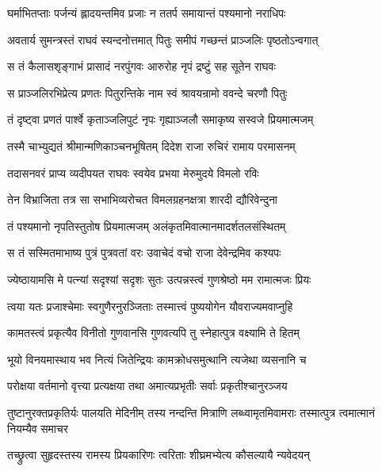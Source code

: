 \twolineshloka
{घर्माभितप्ताः पर्जन्यं ह्लादयन्तमिव प्रजाः}
{न ततर्प समायान्तं पश्यमानो नराधिपः} %

\twolineshloka
{अवतार्य सुमन्त्रस्तं राघवं स्यन्दनोत्तमात्}
{पितुः समीपं गच्छन्तं प्राञ्जलिः पृष्ठतोऽन्वगात्} %

\twolineshloka
{स तं कैलासशृङ्गाभं प्रासादं नरपुंगवः}
{आरुरोह नृपं द्रष्टुं सह सूतेन राघवः} %

\twolineshloka
{स प्राञ्जलिरभिप्रेत्य प्रणतः पितुरन्तिके}
{नाम स्वं श्रावयन्रामो ववन्दे चरणौ पितुः} %

\twolineshloka
{तं दृष्ट्वा प्रणतं पार्श्वे कृताञ्जलिपुटं नृपः}
{गृह्याञ्जलौ समाकृष्य सस्वजे प्रियमात्मजम्} %

\twolineshloka
{तस्मै चाभ्युद्यतं श्रीमान्मणिकाञ्चनभूषितम्}
{दिदेश राजा रुचिरं रामाय परमासनम्} %

\twolineshloka
{तदासनवरं प्राप्य व्यदीपयत राघवः}
{स्वयेव प्रभया मेरुमुदये विमलो रविः} %

\twolineshloka
{तेन विभ्राजिता तत्र सा सभाभिव्यरोचत}
{विमलग्रहनक्षत्रा शारदी द्यौरिवेन्दुना} %

\twolineshloka
{तं पश्यमानो नृपतिस्तुतोष प्रियमात्मजम्}
{अलंकृतमिवात्मानमादर्शतलसंस्थितम्} %

\twolineshloka
{स तं सस्मितमाभाष्य पुत्रं पुत्रवतां वरः}
{उवाचेदं वचो राजा देवेन्द्रमिव कश्यपः} %

\twolineshloka
{ज्येष्ठायामसि मे पत्न्यां सदृश्यां सदृशः सुतः}
{उत्पन्नस्त्वं गुणश्रेष्ठो मम रामात्मजः प्रियः} %

\twolineshloka
{त्वया यतः प्रजाश्चेमाः स्वगुणैरनुरञ्जिताः}
{तस्मात्त्वं पुष्ययोगेन यौवराज्यमवाप्नुहि} %

\twolineshloka
{कामतस्त्वं प्रकृत्यैव विनीतो गुणवानसि}
{गुणवत्यपि तु स्नेहात्पुत्र वक्ष्यामि ते हितम्} %

\twolineshloka
{भूयो विनयमास्थाय भव नित्यं जितेन्द्रियः}
{कामक्रोधसमुत्थानि त्यजेथा व्यसनानि च} %

\twolineshloka
{परोक्षया वर्तमानो वृत्त्या प्रत्यक्षया तथा}
{अमात्यप्रभृतीः सर्वाः प्रकृतीश्चानुरञ्जय} %

\threelineshloka
{तुष्टानुरक्तप्रकृतिर्यः पालयति मेदिनीम्}
{तस्य नन्दन्ति मित्राणि लब्ध्वामृतमिवामराः}
{तस्मात्पुत्र त्वमात्मानं नियम्यैव समाचर} %

\twolineshloka
{तच्छ्रुत्वा सुहृदस्तस्य रामस्य प्रियकारिणः}
{त्वरिताः शीघ्रमभ्येत्य कौसल्यायै न्यवेदयन्} %

